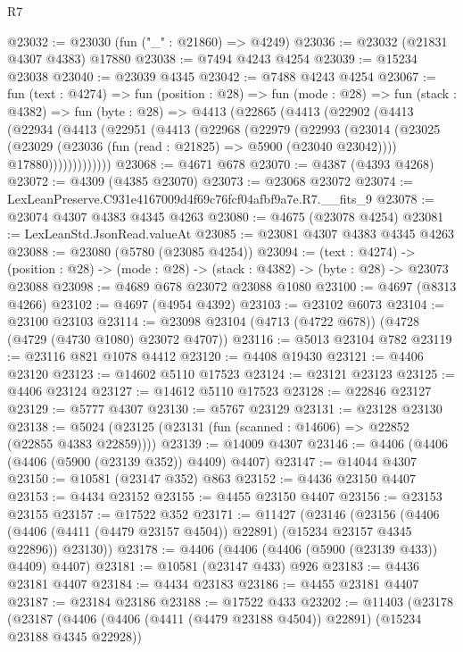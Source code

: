 \begin{lexlean}{R7}
\begin{coremodule}
@23032 := @23030 (fun ("_" : @21860) => @4249)
@23036 := @23032 (@21831 @4307 @4383) @17880
@23038 := @7494 @4243 @4254
@23039 := @15234 @23038
@23040 := @23039 @4345
@23042 := @7488 @4243 @4254
@23067 := fun (text : @4274) =>
  fun (position : @28) =>
  fun (mode : @28) =>
  fun (stack : @4382) =>
  fun (byte : @28) =>
  @4413
    (@22865
      (@4413
        (@22902
          (@4413
            (@22934
              (@4413
                (@22951
                  (@4413
                    (@22968
                      (@22979
                        (@22993
                          (@23014
                            (@23025
                              (@23029 (@23036 (fun (read : @21825) => @5900 (@23040 @23042))))
                              @17880)))))))))))))
@23068 := @4671 @678
@23070 := @4387 (@4393 @4268)
@23072 := @4309 (@4385 @23070)
@23073 := @23068 @23072
@23074 := LexLeanPreserve.C931e4167009d4f69c76fcf04afbf9a7e.R7.__fits_9
@23078 := @23074 @4307 @4383 @4345 @4263
@23080 := @4675 (@23078 @4254)
@23081 := LexLeanStd.JsonRead.valueAt
@23085 := @23081 @4307 @4383 @4345 @4263
@23088 := @23080 (@5780 (@23085 @4254))
@23094 := (text : @4274) ->
  (position : @28) -> (mode : @28) -> (stack : @4382) -> (byte : @28) -> @23073 @23088
@23098 := @4689 @678 @23072 @23088 @1080
@23100 := @4697 (@8313 @4266)
@23102 := @4697 (@4954 @4392)
@23103 := @23102 @6073
@23104 := @23100 @23103
@23114 := @23098 @23104 (@4713 (@4722 @678)) (@4728 (@4729 (@4730 @1080) @23072 @4707))
@23116 := @5013 @23104 @782
@23119 := @23116 @821 @1078 @4412
@23120 := @4408 @19430
@23121 := @4406 @23120
@23123 := @14602 @5110 @17523
@23124 := @23121 @23123
@23125 := @4406 @23124
@23127 := @14612 @5110 @17523
@23128 := @22846 @23127
@23129 := @5777 @4307
@23130 := @5767 @23129
@23131 := @23128 @23130
@23138 := @5024 (@23125 (@23131 (fun (scanned : @14606) => @22852 (@22855 @4383 @22859))))
@23139 := @14009 @4307
@23146 := @4406 (@4406 (@4406 (@5900 (@23139 @352)) @4409) @4407)
@23147 := @14044 @4307
@23150 := @10581 (@23147 @352) @863
@23152 := @4436 @23150 @4407
@23153 := @4434 @23152
@23155 := @4455 @23150 @4407
@23156 := @23153 @23155
@23157 := @17522 @352
@23171 := @11427
    (@23146
      (@23156
        (@4406 (@4406 (@4411 (@4479 @23157 @4504)) @22891) (@15234 @23157 @4345 @22896))
        @23130))
@23178 := @4406 (@4406 (@4406 (@5900 (@23139 @433)) @4409) @4407)
@23181 := @10581 (@23147 @433) @926
@23183 := @4436 @23181 @4407
@23184 := @4434 @23183
@23186 := @4455 @23181 @4407
@23187 := @23184 @23186
@23188 := @17522 @433
@23202 := @11403
    (@23178
      (@23187
        (@4406 (@4406 (@4411 (@4479 @23188 @4504)) @22891) (@15234 @23188 @4345 @22928))

\end{coremodule}
\end{lexlean}
